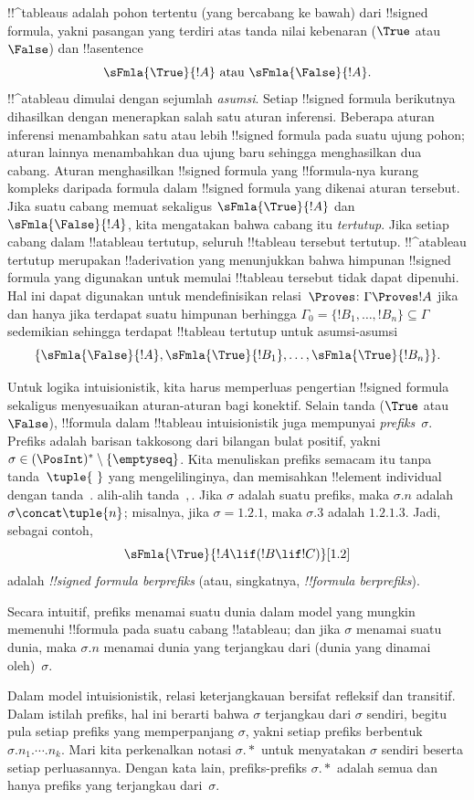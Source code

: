 \documentclass[../../../include/open-logic-section]{subfiles}
\begin{document}


!!^{tableau}s adalah pohon tertentu (yang bercabang ke bawah) dari
!!{signed formula}, yakni pasangan yang terdiri atas tanda nilai kebenaran
($\True$ atau $\False$) dan !!a{sentence}
\[
\sFmla{\True}{!A} \text{ atau } \sFmla{\False}{!A}.
\]
!!^a{tableau} dimulai dengan sejumlah \emph{asumsi}. Setiap
!!{signed formula} berikutnya dihasilkan dengan menerapkan salah satu aturan
inferensi. Beberapa aturan inferensi menambahkan satu atau lebih
!!{signed formula} pada suatu ujung pohon; aturan lainnya menambahkan dua
ujung baru sehingga menghasilkan dua cabang. Aturan menghasilkan
!!{signed formula} yang !!{formula}-nya kurang kompleks daripada formula
dalam !!{signed formula} yang dikenai aturan tersebut. Jika suatu cabang
memuat sekaligus $\sFmla{\True}{!A}$ dan $\sFmla{\False}{!A}$, kita mengatakan
bahwa cabang itu \emph{tertutup}. Jika setiap cabang dalam !!a{tableau}
tertutup, seluruh !!{tableau} tersebut tertutup. !!^a{tableau} tertutup
merupakan !!a{derivation} yang menunjukkan bahwa himpunan !!{signed formula}
yang digunakan untuk memulai !!{tableau} tersebut tidak dapat dipenuhi. Hal
ini dapat digunakan untuk mendefinisikan relasi~$\Proves$:
$\Gamma \Proves !A$ jika dan hanya jika terdapat suatu himpunan berhingga
$\Gamma_0 = \{!B_1, \dots, !B_n\} \subseteq \Gamma$ sedemikian sehingga
terdapat !!{tableau} tertutup untuk asumsi-asumsi
\[
\{\sFmla{\False}{!A}, \sFmla{\True}{!B_1}, \dots, \sFmla{\True}{!B_n}\}.
\]

Untuk logika intuisionistik, kita harus memperluas pengertian
!!{signed formula} sekaligus menyesuaikan aturan-aturan bagi konektif. Selain
tanda ($\True$ atau $\False$), !!{formula} dalam !!{tableau} intuisionistik
juga mempunyai \emph{prefiks}~$\sigma$. Prefiks adalah barisan takkosong dari
bilangan bulat positif, yakni
$\sigma \in (\PosInt)^* \setminus \{\emptyseq\}$. Kita menuliskan prefiks
semacam itu tanpa tanda~$\tuple{\ }$ yang mengelilinginya, dan memisahkan
!!{element} individual dengan tanda~$.$ alih-alih tanda~$,$. Jika $\sigma$
adalah suatu prefiks, maka $\sigma.n$ adalah
$\sigma \concat \tuple{n}$; misalnya, jika $\sigma = 1.2.1$, maka
$\sigma.3$ adalah $1.2.1.3$. Jadi, sebagai contoh,
\[
\sFmla{\True}{!A \lif (!B \lif !C)}[1.2]
\]
adalah \emph{!!{signed formula} berprefiks} (atau, singkatnya,
\emph{!!{formula} berprefiks}).

Secara intuitif, prefiks menamai suatu dunia dalam model yang mungkin
memenuhi !!{formula} pada suatu cabang !!a{tableau}; dan jika $\sigma$
menamai suatu dunia, maka $\sigma.n$ menamai dunia yang terjangkau dari
(dunia yang dinamai oleh)~$\sigma$.

Dalam model intuisionistik, relasi keterjangkauan bersifat refleksif dan
transitif. Dalam istilah prefiks, hal ini berarti bahwa $\sigma$ terjangkau
dari $\sigma$ sendiri, begitu pula setiap prefiks yang memperpanjang
$\sigma$, yakni setiap prefiks berbentuk $\sigma.n_1.\cdots.n_k$. Mari kita
perkenalkan notasi $\sigma.*$ untuk menyatakan $\sigma$ sendiri beserta
setiap perluasannya. Dengan kata lain, prefiks-prefiks $\sigma.*$ adalah
semua dan hanya prefiks yang terjangkau dari~$\sigma$.
\end{document}
